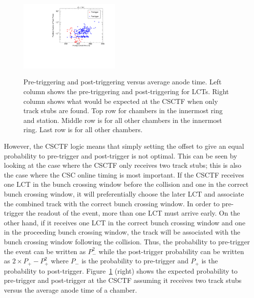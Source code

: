 \begin{figure}
\begin{center}
      \includegraphics[clip=true, trim=0.0cm 0cm 0.0cm 0cm, width=0.44\textwidth]{figures/timing/Ring2_Anode_vs_TF_all} \\
      \caption[CSC pre-triggering and post-triggering versus average anode time for LCTs and expected behavior at CSCTF]
      {Pre-triggering and post-triggering versus average anode time. Left column shows the pre-triggering and post-triggering for LCTs.
Right column shows what would be expected at the CSCTF when only track stubs are found.
Top row for chambers in the innermost ring and station. Middle row is for all other chambers in the innermost ring.
Last row is for all other chambers.
        }
      \label{fig:AnodevsprePost}
  \end{center}
\end{figure}

However, the CSCTF logic means that simply setting the offset to give an equal probability to pre-trigger and post-trigger is not optimal. This can be seen by looking at
the case where the CSCTF only receives two track stubs; this is also the case where the CSC online timing is most important. If the CSCTF receives one LCT in the bunch
crossing window before the collision and one in the correct bunch crossing window, it will preferentially choose the later LCT and associate the combined track with the correct
bunch crossing window.  In order to pre-trigger the readout of the event, more than one LCT must arrive early.
On the other hand, if it receives one LCT in the correct bunch crossing window and one in the proceeding bunch crossing window, the track will be associated with the
bunch crossing window following the collision. Thus, the probability to pre-trigger the event can be written as $P_{-}^2$ while the post-trigger probability can be written as
$2 \times P_{+} - P_{+}^2$ where $P_{-}$ is the probability to pre-trigger and $P_{+}$ is the probability to post-trigger.
Figure~\ref{fig:AnodevsprePost} (right) shows the expected probability to pre-trigger and post-trigger at the CSCTF assuming it receives two track stubs versus
the average anode time of a chamber.

